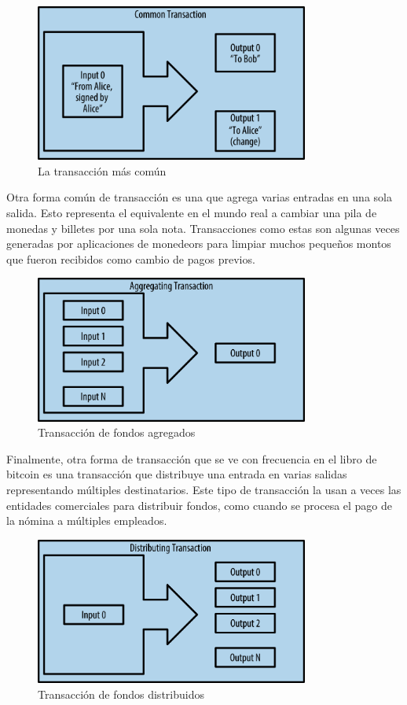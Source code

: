 \documentclass[10pt,journal,compsoc]{IEEEtran}
\begin{document}
\begin{figure}[h]
    \center
    \includegraphics[width=9cm]{trans1}
    \caption{La transacción más común}
    \label{fig:trans1}
\end{figure}

Otra forma común de transacción es una que agrega varias entradas en una sola salida. Esto representa el equivalente en el mundo real a cambiar una pila de monedas y billetes por una sola nota. Transacciones como estas son algunas veces generadas por aplicaciones de monedeors para limpiar muchos pequeños montos que fueron recibidos como cambio de pagos previos.

\begin{figure}[h]
    \center
    \includegraphics[width=9cm]{trans2}
    \caption{Transacción de fondos agregados}
    \label{fig:trans2}
\end{figure}

Finalmente, otra forma de transacción que se ve con frecuencia en el libro de bitcoin es una transacción que distribuye una entrada en varias salidas representando múltiples destinatarios. Este tipo de transacción la usan a veces las entidades comerciales para distribuir fondos, como cuando se procesa el pago de la nómina a múltiples empleados.

\begin{figure}[h]
    \center
    \includegraphics[width=9cm]{trans3}
    \caption{Transacción de fondos distribuidos}
    \label{fig:trans3}
\end{figure}
\end{document}
